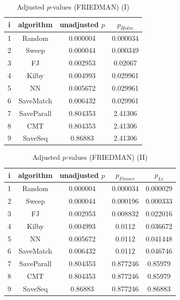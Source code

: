 \documentclass[a4paper,10pt]{article}
\begin{document}
\begin{landscape}
\begin{table}[!htp]
\centering\small
\begin{tabular}{cccc}
i&algorithm&unadjusted $p$&$p_{Holm}$\\
\hline1&Random&0.000004&0.000034\\2&Sweep&0.000044&0.000349\\3&FJ&0.002953&0.02067\\4&Kilby&0.004993&0.029961\\5&NN&0.005672&0.029961\\6&SaveMatch&0.006432&0.029961\\7&SaveParall&0.804353&2.41306\\8&CMT&0.804353&2.41306\\9&SaveSeq&0.86883&2.41306\\\hline
\end{tabular}
\caption{Adjusted $p$-values (FRIEDMAN) (I)}
\end{table}
\begin{table}[!htp]
\centering\small
\begin{tabular}{ccccc}
i&algorithm&unadjusted $p$&$p_{Finner}$&$p_{Li}$\\
\hline1&Random&0.000004&0.000034&0.000029\\2&Sweep&0.000044&0.000196&0.000333\\3&FJ&0.002953&0.008832&0.022016\\4&Kilby&0.004993&0.0112&0.036672\\5&NN&0.005672&0.0112&0.041448\\6&SaveMatch&0.006432&0.0112&0.046746\\7&SaveParall&0.804353&0.877246&0.85979\\8&CMT&0.804353&0.877246&0.85979\\9&SaveSeq&0.86883&0.877246&0.86883\\\hline
\end{tabular}
\caption{Adjusted $p$-values (FRIEDMAN) (II)}
\end{table}

\newpage
\end{landscape}
\end{document}
